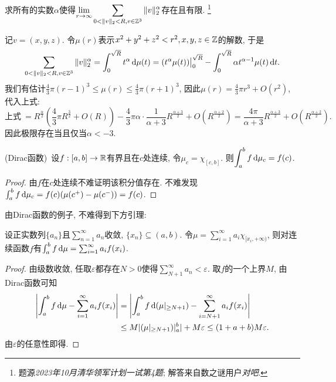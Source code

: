\begin{example}
	求所有的实数$\alpha$使得$\displaystyle \lim_{r \to \infty} \sum_{0<\| v \|_2 < R ,v \in \mathbb{Z} ^3} \| v \|_2 ^{\alpha}$存在且有限. \footnote{题源\textit{2023年10月清华领军计划一试第4题}; 解答来自数之谜用户\textit{对吧}. }
\end{example}
\begin{solution}
	记$v=(x,y,z)$. 令$\mu (r)$表示$x^2+y^2+z^2<r^2,x,y,z \in \mathbb{Z}$的解数, 于是$$\sum_{0<\| v \|_2 < R ,v \in \mathbb{Z} ^3} \| v \|_2 ^{\alpha} = \int_0^{\sqrt{R}} t^{\alpha} \mathop{}\!\mathrm{d} \mu (t) = (t^{\alpha} \mu (t))\big|_0^{\sqrt{R}} - \int_0^{\sqrt{R}} \alpha t^{\alpha -1} \mu (t) \mathop{}\!\mathrm{d} t.$$
	我们有估计$\frac{4}{3}\pi (r-1)^3 \leq \mu (r) \leq \frac{4}{3}\pi (r+1)^3$, 因此$\mu (r) = \frac{4}{3}\pi r^3+O(r^2)$, 代入上式: $$\textit{上式}~= R^{\frac{\alpha}{2}}\left( \frac{4}{3}\pi R^{\frac{3}{2}}+O(R) \right) - \frac{4}{3}\pi \alpha \cdot \frac{1}{\alpha +3} R^{\frac{\alpha +3}{2}} + O(R^{\frac{\alpha +2}{2}}) = \frac{4\pi}{\alpha +3} R^{\frac{\alpha +3}{2}} + O(R^{\frac{\alpha +2}{2}}).$$
	因此极限存在当且仅当$\alpha <-3$. 
\end{solution}

\begin{example}
	(Dirac函数)~设$f:[a,b] \to \mathbb{R}$有界且在$c$处连续, 令$\mu _c=\chi _{[c,b]}$. 则$\displaystyle \int_a^b f \mathop{}\!\mathrm{d} \mu _c = f(c)$. 
\end{example}
\begin{proof}
	由$f$在$c$处连续不难证明该积分值存在. 不难发现$\int_a^b f \mathop{}\!\mathrm{d} \mu _c = f(c)(\mu (c^+)- \mu (c^-)) = f(c)$. 
\end{proof}

由Dirac函数的例子, 不难得到下方引理: 

\begin{lemma}{}
	设正实数列$\{ a_n \}$且$\sum_{n=1}^{\infty} a_n$收敛, $\{ x_n \}\subseteq (a,b)$. 令$\mu = \sum_{i=1}^{\infty} a_i\chi _{[x_i,+\infty)}$, 则对连续函数$f$有$\int_a^b f \mathop{}\!\mathrm{d} \mu = \sum_{i=1}^{\infty} a_if(x_i)$. 
\end{lemma}
\begin{proof}
	由级数收敛, 任取$\varepsilon$都存在$N>0$使得$\sum_{N+1}^{\infty} a_n <\varepsilon$. 取$f$的一个上界$M$, 由Dirac函数可知
	\begin{align*}
		\left| \int_a^b f \mathop{}\!\mathrm{d} \mu - \sum_{i=1}^{\infty} a_if(x_i) \right| &= \left| \int_a^b f \mathop{}\!\mathrm{d} (\mu|_{\geq N+1}) - \sum_{i=N+1}^{\infty} a_if(x_i) \right| \\
		&\leq M|(\mu|_{\geq N+1})|_a^b| + M\varepsilon \leq (1+a+b)M\varepsilon .
	\end{align*}
	由$\varepsilon$的任意性即得. 
\end{proof}

\begin{example}
	
\end{example}




